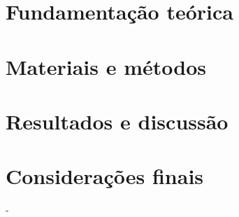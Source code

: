 \documentclass[
	12pt,				%
	openright,			%
	twoside,			%
	a4paper,			%
	chapter=TITLE,		%
	english,			%
	french,				%
	spanish,			%
	brazil,				%
	hyphens,
  oldfontcommands
	]{abntex2}
\theoremstyle{definition}
\theoremstyle{definition}
\begin{document}
\chapter{Fundamentação teórica} \label{fundteorica}





\chapter{Materiais e métodos} \label{metodologia}



\chapter{Resultados e discussão} \label{results}


% 

\chapter{Considerações finais} \label{conclusao}


-
\postextual




%
%


\begin{apendicesenv}



\end{apendicesenv}
\end{document}
